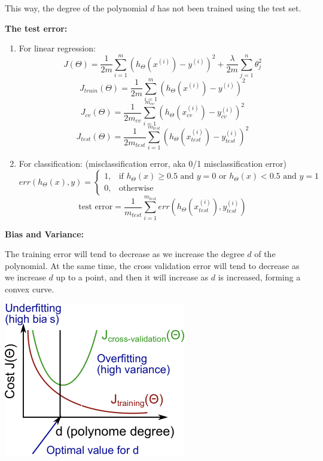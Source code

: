 \documentclass{article}
\begin{document}
\noindent This way, the degree of the polynomial \(d\) has not been trained using the test set.

\bigskip

\noindent \textbf{The test error:}
\begin{enumerate}
\item For linear regression:
\[J(\Theta) = \frac{1}{2m} \sum_{i = 1}^{m} (h_{\Theta}(x^{(i)}) - y^{(i)})^2 + \frac{\lambda}{2m} \sum_{j=1}^n \theta_j^2\]
\[J_{train}(\Theta) = \frac{1}{2m} \sum_{i = 1}^{m} (h_{\Theta}(x^{(i)}) - y^{(i)})^2\]
\[J_{cv}(\Theta) = \frac{1}{2m_{cv}} \sum_{i = 1}^{m_{cv}} (h_{\Theta}(x_{cv}^{(i)}) - y_{cv}^{(i)})^2\]
\[J_{test}(\Theta) = \frac{1}{2m_{test}} \sum_{i = 1}^{m_{test}} (h_{\Theta}(x_{test}^{(i)}) - y_{test}^{(i)})^2\]
\item For classification: (misclassification error, aka 0/1 misclassification error)
\[err(h_{\Theta}(x), y) = 
\begin{cases}
1, & \text{if } h_{\Theta}(x) \geq 0.5 \text{ and } y = 0 \text{ or } h_{\Theta}(x) < 0.5 \text{ and } y = 1\\
0, & \text{otherwise}
\end{cases}
\]
\[\text{test error} = \frac{1}{m_{test}} \sum_{i = 1}^{m_{test}} err(h_{\Theta}(x_{test}^{(i)}), y_{test}^{(i)})\]
\end{enumerate}

\noindent \textbf{Bias and Variance:}

\noindent The training error will tend to decrease as we increase the degree \(d\) of the polynomial. At the same time, the cross validation error will tend to decrease as we increase \(d\) up to a point, and then it will increase as \(d\) is increased, forming a convex curve.

\begin{center}
\includegraphics[scale=0.4]{./images/bias_and_variance_polynomial.png}
\end{center}
\end{document}
